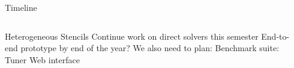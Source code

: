 \begin{frame}{Timeline}
\begin{columns}
\centering
\begin{outline}
  \1 Heterogeneous Stencils
  \2 Continue work on direct solvers this semester 
  \2 End-to-end prototype by end of the year?
  \1 We also need to plan:
  \2 Benchmark suite:
  \2 Tuner
  \2 Web interface
\end{outline}

\begin{center}
\centering


\end{center}
\end{columns}
\end{frame}

